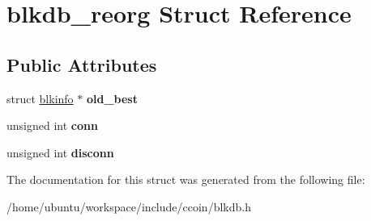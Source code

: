 \hypertarget{structblkdb__reorg}{\section{blkdb\-\_\-reorg Struct Reference}
\label{structblkdb__reorg}
}
\subsection*{Public Attributes}
\begin{DoxyCompactItemize}
\item 
\hypertarget{structblkdb__reorg_a8513696a46a127551c31f739976c829a}{struct \hyperlink{structblkinfo}{blkinfo} $\ast$ {\bfseries old\-\_\-best}}\label{structblkdb__reorg_a8513696a46a127551c31f739976c829a}

\item 
\hypertarget{structblkdb__reorg_a3ca585b673f04d381dd6d90fae4a616e}{unsigned int {\bfseries conn}}\label{structblkdb__reorg_a3ca585b673f04d381dd6d90fae4a616e}

\item 
\hypertarget{structblkdb__reorg_a4f1c3ef0ba1e6ebbd20f786fb4b05915}{unsigned int {\bfseries disconn}}\label{structblkdb__reorg_a4f1c3ef0ba1e6ebbd20f786fb4b05915}

\end{DoxyCompactItemize}


The documentation for this struct was generated from the following file\-:\begin{DoxyCompactItemize}
\item 
/home/ubuntu/workspace/include/ccoin/blkdb.\-h\end{DoxyCompactItemize}
